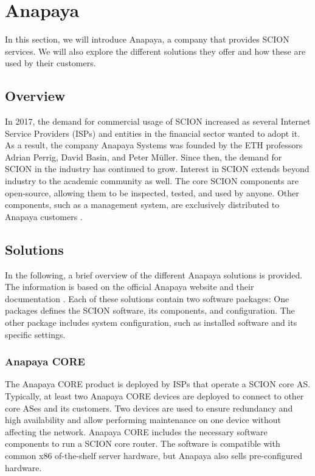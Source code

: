 \section{Anapaya}
\label{sec:anapaya}
In this section, we will introduce Anapaya, a company that provides SCION services.
We will also explore the different solutions they offer and how these are used by their customers.

\subsection{Overview}
In 2017, the demand for commercial usage of SCION increased as several Internet Service Providers (ISPs) and entities in the financial sector wanted to adopt it.
As a result, the company Anapaya Systems was founded by the ETH professors Adrian Perrig, David Basin, and Peter Müller.
Since then, the demand for SCION in the industry has continued to grow.
Interest in SCION extends beyond industry to the academic community as well.
The core SCION components are open-source, allowing them to be inspected, tested, and used by anyone.
Other components, such as a management system, are exclusively distributed to Anapaya customers \cite{ethzSecureInternet}.


\subsection{Solutions}
In the following, a brief overview of the different Anapaya solutions is provided.
The information is based on the official Anapaya website \cite{anapayaHomepage} and their documentation \cite{anapayaDocs}.
Each of these solutions contain two software packages:
One packages defines the SCION software, its components, and configuration.
The other package includes system configuration, such as installed software and its  specific settings.

\subsubsection{Anapaya CORE}
The Anapaya CORE product is deployed by ISPs that operate a SCION core AS.
Typically, at least two Anapaya CORE devices are deployed to connect to other core ASes and its customers.
Two devices are used to ensure redundancy and high availability and allow performing maintenance on one device without affecting the network.
Anapaya CORE includes the necessary software components to run a SCION core router.
The software is compatible with common x86 of-the-shelf server hardware, but Anapaya also sells pre-configured hardware.


